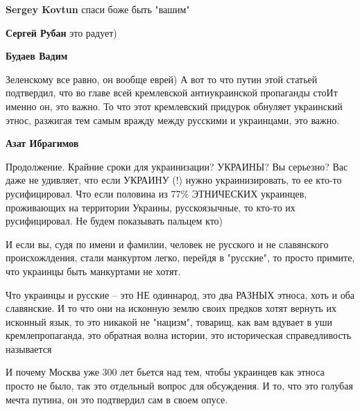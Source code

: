 \begin{itemize}
\begin{itemize}
\textbf{Sergey Kovtun} спаси боже быть "вашим"

 
\textbf{Сергей Рубан} это радует)

 
\textbf{Будаев Вадим} 

Зеленскому все равно, он вообще еврей) А вот то что путин этой статьей
подтвердил, что во главе всей кремлевской антиукраинской пропаганды стоИт
именно он, это важно. То что этот кремлевский придурок обнуляет украинский
этнос, разжигая тем самым вражду между русскими и украинцами, это важно.

 
\textbf{Азат Ибрагимов} 

Продолжение. Крайние сроки для украинизации? УКРАИНЫ? Вы серьезно? Вас даже не
удивляет, что если УКРАИНУ (!) нужно украинизировать, то ее кто-то
русифицировал. Что если половина из 77\% ЭТНИЧЕСКИХ украинцев, проживающих на
территории Украины, русскоязычные, то кто-то их русифицировал. Не будем
показывать пальцем кто) 

И если вы, судя по имени и фамилии, человек не русского и не славянского
происхожлдения, стали манкуртом легко, перейдя в "русские", то просто примите,
что украинцы быть манкуртами не хотят. 

Что украинцы и русские – это НЕ одиннарод, это два РАЗНЫХ этноса, хоть и оба
славянские. И то что они на исконную землю своих предков хотят вернуть их
исконный язык, то это никакой не "нацизм", товарищ, как вам вдувает в уши
кремлепропаганда, это обратная волна истории, это историческая справедливость
называется

И почему Москва уже 300 лет бьется над тем, чтобы украинцев как этноса просто
не было, так это отдельный вопрос для обсуждения. И то, что это голубая мечта
путина, он это подтвердил сам в своем опусе.


\end{itemize}
\end{itemize}
